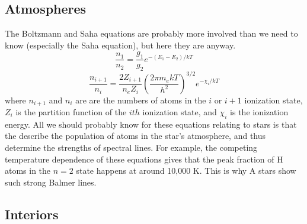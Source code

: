 \subsection{Atmospheres}
The Boltzmann and Saha equations are probably more involved than we need to know (especially the 
Saha equation), but here they are anyway.
\begin{equation}
\frac{n_1}{n_2}=\frac{g_1}{g_2}e^{-(E_1-E_2)/kT}
\end{equation}
\begin{equation}
\frac{n_{i+1}}{n_i}=\frac{2Z_{i+1}}{n_eZ_i}\left(\frac{2\pi m_ekT}{h^2}\right)^{3/2}e^{-\chi_i/kT}
\end{equation}
where $n_{i+1}$ and $n_i$ are are the numbers of atoms in the $i$ or $i+1$ ionization state, 
$Z_i$ is the partition function of the $ith$ ionization state, and $\chi_i$ is the ionization 
energy.  All we should probably know for these equations relating to stars is that the describe 
the population of atoms in the star's atmosphere, and thus determine the strengths of spectral 
lines.  For example, the competing temperature dependence of these equations gives that the 
peak fraction of H atoms in the $n=2$ state happens at around 10,000 K.  This is why A stars show 
such strong Balmer lines.

\subsection{Interiors}



